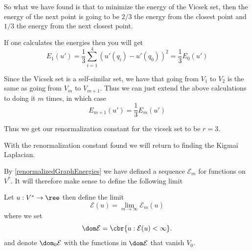 So what we have found is that to minimize the energy of the Vicsek set, then the energy of the next point is going to be $2/3$ the energy from the closest point and $1/3$ the energy from the next closest point. 

If one calculates the energies then you will get
\begin{equation}
	E_1(u') =\frac{1}{3}\sum_{i = 1}^{4}(u'(q_i) - u'(q_0))^2 = \frac{1}{3}E_0(u')
\end{equation}

Since the Vicsek set is a self-similar set, we have that going from $V_1$ to $V_2$ is the same as going from $V_m$ to $V_{m+1}$. Thus we can just extend the above calculations to doing it $m$ times, in which case
\begin{equation}
	E_{m+1}(u') = \frac{1}{3}E_m(u')
\end{equation}

Thus we get our renormalization constant for the vicsek set to be $r = 3$.


With the renormalization constant found we will return to finding the Kigmai Laplacian.

By \cref{renormalizedGraphEnergies} we have defined a sequence $\mathcal{E}_m$ for functions on $V^{*}$. It will therefore make sense to define the following limit
\begin{defi} Let $u: V^{*} \to \ree$ then define the limit
	\begin{equation}
		\mathcal{E}(u) = \lim_{m \to \infty} \mathcal{E}_{m}(u)
	\end{equation}
	where we set
	\begin{equation}
		\dom \mathcal{E} = \cbr{u : \mathcal{E}(u) < \infty}.
	\end{equation}
	and denote $\dom_0 \mathcal{E}$ with the functions in $\dom \mathcal{E}$ that vanish $V_0$.
\end{defi}

